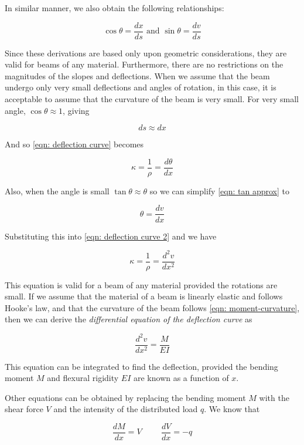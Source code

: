 \documentclass[
10pt,
a4paper,
openany,
svgnames,
]{book} %
\begin{document}
In similar manner, we also obtain the following relationships:

\[\cos \theta  = \frac{dx}{ds} \text{ and } \sin \theta  = \frac{dv}{ds}\]

Since these derivations are based only upon geometric considerations, they are valid for beams of any material. Furthermore, there are no restrictions on the magnitudes of the slopes and deflections.
When we assume that the beam undergo only very small deflections and angles of rotation, in this case, it is acceptable to assume that the curvature of the beam is very small. For very small angle, $\cos\theta \approx 1$, giving

\[ds \approx dx\]

And so \cref{eqn: deflection curve} becomes

\begin{equation} \label{eqn: deflection curve 2}
  \kappa  = \frac{1}{\rho } = \frac{d\theta}{dx}
\end{equation}

Also, when the angle is small $\tan\theta \approx \theta$ so we can simplify \cref{eqn: tan approx} to

\[\theta  = \frac{{dv}}{{dx}}\]

Substituting this into \cref{eqn: deflection curve 2} and we have

\[\kappa  = \frac{1}{\rho } = \frac{d^2v}{dx^2}\]

This equation is valid for a beam of any material provided the rotations are small. If we assume that the material of a beam is linearly elastic and follows Hooke’s law, and that the curvature of the beam follows \cref{eqn: moment-curvature}, then we can derive the \emph{differential equation of the deflection curve} as

\begin{equation} \label{eqn: diff equation of deflection}
  \frac{d^2v}{dx^2} = \frac{M}{EI}
\end{equation}

This equation can be integrated to find the deflection, provided the bending moment $M$ and flexural rigidity $EI$ are known as a function of $x$.

Other equations can be obtained by replacing the bending moment $M$ with the shear force $V$ and the intensity of the distributed load $q$. We know that

\begin{equation} \label{eqn: shear force and load intensity}
  \frac{{dM}}{{dx}} = V \hspace{1cm} \frac{{dV}}{{dx}} =  - q
\end{equation}
\end{document}
